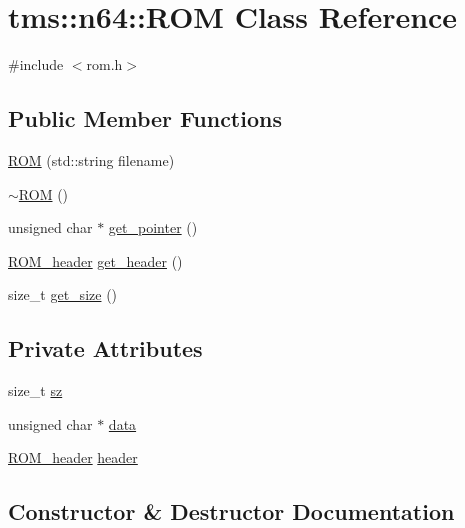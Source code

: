 \hypertarget{classtms_1_1n64_1_1_r_o_m}{}\section{tms\+:\+:n64\+:\+:R\+OM Class Reference}
\label{classtms_1_1n64_1_1_r_o_m}


{\ttfamily \#include $<$rom.\+h$>$}

\subsection*{Public Member Functions}
\begin{DoxyCompactItemize}
\item 
\hyperlink{classtms_1_1n64_1_1_r_o_m_a7e87314eba5a54c43ef3702bbd3b3e32}{R\+OM} (std\+::string filename)
\item 
\hyperlink{classtms_1_1n64_1_1_r_o_m_a39dc8a81d60d845c48e870f423d975f7}{$\sim$\+R\+OM} ()
\item 
unsigned char $\ast$ \hyperlink{classtms_1_1n64_1_1_r_o_m_a9adf8f990cbf1041dbac8bbd1f17e26c}{get\+\_\+pointer} ()
\item 
\hyperlink{structtms_1_1n64_1_1_r_o_m__header}{R\+O\+M\+\_\+header} \hyperlink{classtms_1_1n64_1_1_r_o_m_a612c1560d33d010941f8ac4bcf7ead04}{get\+\_\+header} ()
\item 
size\+\_\+t \hyperlink{classtms_1_1n64_1_1_r_o_m_aaa7c99f8b3978f36ca1898822d261111}{get\+\_\+size} ()
\end{DoxyCompactItemize}
\subsection*{Private Attributes}
\begin{DoxyCompactItemize}
\item 
size\+\_\+t \hyperlink{classtms_1_1n64_1_1_r_o_m_a8784387b5b9c8ac9b200e4efa0aa26cc}{sz}
\item 
unsigned char $\ast$ \hyperlink{classtms_1_1n64_1_1_r_o_m_adf4f412dee578d3bf1a6e0435515153d}{data}
\item 
\hyperlink{structtms_1_1n64_1_1_r_o_m__header}{R\+O\+M\+\_\+header} \hyperlink{classtms_1_1n64_1_1_r_o_m_af9f61bf94457c1c03755674f73edbebc}{header}
\end{DoxyCompactItemize}


\subsection{Constructor \& Destructor Documentation}
\mbox{\label{classtms_1_1n64_1_1_r_o_m_a7e87314eba5a54c43ef3702bbd3b3e32}} 
